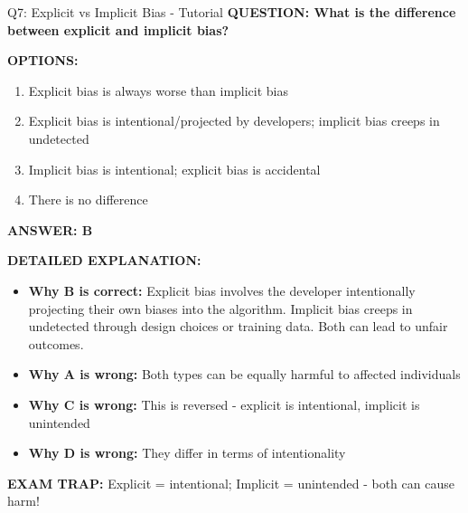 \documentclass[8pt]{beamer}
\begin{document}
	\begin{frame}{Q7: Explicit vs Implicit Bias - Tutorial}
		\fontsize{6.5}{7.5}\selectfont
		\textbf{QUESTION: What is the difference between explicit and implicit bias?}
		
		\vspace{0.1cm}
		\textbf{OPTIONS:}
		\begin{enumerate}
			\item Explicit bias is always worse than implicit bias
			\item Explicit bias is intentional/projected by developers; implicit bias creeps in undetected
			\item Implicit bias is intentional; explicit bias is accidental
			\item There is no difference
		\end{enumerate}
		
		\vspace{0.1cm}
		\textcolor{myblue}{\textbf{ANSWER: B}}
		
		\vspace{0.1cm}
		\textbf{DETAILED EXPLANATION:}
		\begin{itemize}
			\item \textbf{Why B is correct:} Explicit bias involves the developer intentionally projecting their own biases into the algorithm. Implicit bias creeps in undetected through design choices or training data. Both can lead to unfair outcomes.
			\item \textbf{Why A is wrong:} Both types can be equally harmful to affected individuals
			\item \textbf{Why C is wrong:} This is reversed - explicit is intentional, implicit is unintended
			\item \textbf{Why D is wrong:} They differ in terms of intentionality
		\end{itemize}
		
		\textcolor{myred}{\textbf{EXAM TRAP:}} Explicit = \textcolor{myblue}{intentional}; Implicit = \textcolor{myblue}{unintended} - both can cause harm!
	\end{frame}
	
\end{document}
